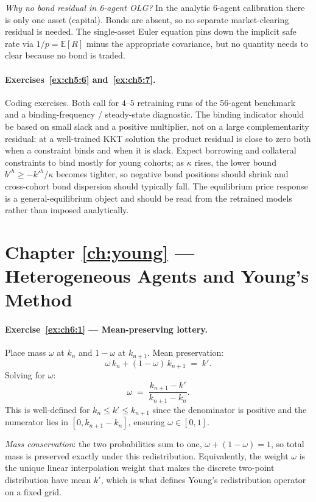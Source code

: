\documentclass[11pt,a4paper]{report}
\begin{document}
\emph{Why no bond residual in 6-agent OLG?}  In the analytic 6-agent calibration there is only one asset (capital).  Bonds are absent, so no separate market-clearing residual is needed.  The single-asset Euler equation pins down the implicit safe rate via $1/p = \mathbb{E}[R]$ minus the appropriate covariance, but no quantity needs to clear because no bond is traded.

\paragraph{Exercises~\ref{ex:ch5:6} and~\ref{ex:ch5:7}.}
Coding exercises.  Both call for $4$--$5$ retraining runs of the 56-agent benchmark and a binding-frequency / steady-state diagnostic.  The binding indicator should be based on small slack and a positive multiplier, not on a large complementarity residual: at a well-trained KKT solution the product residual is close to zero both when a constraint binds and when it is slack.  Expect borrowing and collateral constraints to bind mostly for young cohorts; as $\kappa$ rises, the lower bound $b'^h \ge -k'^h/\kappa$ becomes tighter, so negative bond positions should shrink and cross-cohort bond dispersion should typically fall.  The equilibrium price response is a general-equilibrium object and should be read from the retrained models rather than imposed analytically.

\section{Chapter \ref{ch:young} --- Heterogeneous Agents and Young's Method}
\label{sol:ch6}

\paragraph{Exercise~\ref{ex:ch6:1} --- Mean-preserving lottery.}
Place mass $\omega$ at $k_n$ and $1-\omega$ at $k_{n+1}$.  Mean preservation:
\[
   \omega\,k_n + (1-\omega)\,k_{n+1} \;=\; k'.
\]
Solving for $\omega$:
\[
   \omega \;=\; \frac{k_{n+1} - k'}{k_{n+1} - k_n}.
\]
This is well-defined for $k_n \le k' \le k_{n+1}$ since the denominator is positive and the numerator lies in $[0, k_{n+1} - k_n]$, ensuring $\omega \in [0,1]$.

\emph{Mass conservation}: the two probabilities sum to one, $\omega + (1-\omega) = 1$, so total mass is preserved exactly under this redistribution.  Equivalently, the weight $\omega$ is the unique linear interpolation weight that makes the discrete two-point distribution have mean $k'$, which is what defines Young's redistribution operator on a fixed grid.
\end{document}

